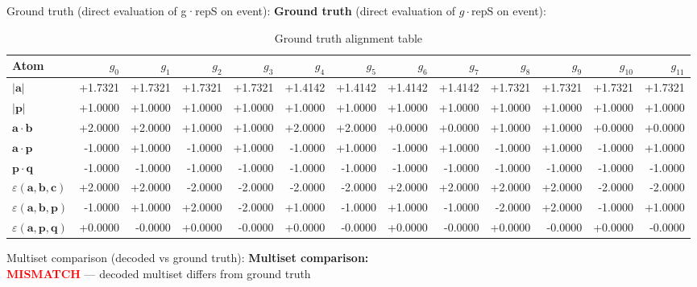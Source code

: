 \documentclass[a4paper,11pt]{article}
\newcommand{\vc}[1]{\ensuremath{\mathbf{#1}}}
\newcommand{\dnfagmiihhiejm}[1]{|\vc{#1}|}
\newcommand{\pdcegfomjfhook}[2]{\mathbf{#1} \cdot \mathbf{#2}}
\newcommand{\kblbmcpggoncpf}[3]{\varepsilon(\mathbf{#1},\mathbf{#2},\mathbf{#3})}
\begin{document}
  Ground truth  (direct evaluation of g·repS on event):
\textbf{Ground truth} (direct evaluation of $g \cdot \text{repS}$ on event):\\
\begin{table}[h]\centering
\caption{Ground truth alignment table}
\begin{tabular}{lrrrrrrrrrrrr}
\toprule
Atom & $g_{0}$ & $g_{1}$ & $g_{2}$ & $g_{3}$ & $g_{4}$ & $g_{5}$ & $g_{6}$ & $g_{7}$ & $g_{8}$ & $g_{9}$ & $g_{10}$ & $g_{11}$ \\
\midrule
$\dnfagmiihhiejm{a}$ & +1.7321 & +1.7321 & +1.7321 & +1.7321 & +1.4142 & +1.4142 & +1.4142 & +1.4142 & +1.7321 & +1.7321 & +1.7321 & +1.7321 \\
$\dnfagmiihhiejm{p}$ & +1.0000 & +1.0000 & +1.0000 & +1.0000 & +1.0000 & +1.0000 & +1.0000 & +1.0000 & +1.0000 & +1.0000 & +1.0000 & +1.0000 \\
$\pdcegfomjfhook{a}{b}$ & +2.0000 & +2.0000 & +1.0000 & +1.0000 & +2.0000 & +2.0000 & +0.0000 & +0.0000 & +1.0000 & +1.0000 & +0.0000 & +0.0000 \\
$\pdcegfomjfhook{a}{p}$ & -1.0000 & +1.0000 & -1.0000 & +1.0000 & -1.0000 & +1.0000 & -1.0000 & +1.0000 & -1.0000 & +1.0000 & -1.0000 & +1.0000 \\
$\pdcegfomjfhook{p}{q}$ & -1.0000 & -1.0000 & -1.0000 & -1.0000 & -1.0000 & -1.0000 & -1.0000 & -1.0000 & -1.0000 & -1.0000 & -1.0000 & -1.0000 \\
$\kblbmcpggoncpf{a}{b}{c}$ & +2.0000 & +2.0000 & -2.0000 & -2.0000 & -2.0000 & -2.0000 & +2.0000 & +2.0000 & +2.0000 & +2.0000 & -2.0000 & -2.0000 \\
$\kblbmcpggoncpf{a}{b}{p}$ & -1.0000 & +1.0000 & +2.0000 & -2.0000 & +1.0000 & -1.0000 & +1.0000 & -1.0000 & -2.0000 & +2.0000 & -1.0000 & +1.0000 \\
$\kblbmcpggoncpf{a}{p}{q}$ & +0.0000 & -0.0000 & +0.0000 & -0.0000 & +0.0000 & -0.0000 & +0.0000 & -0.0000 & +0.0000 & -0.0000 & +0.0000 & -0.0000 \\
\bottomrule\end{tabular}\end{table}

  Multiset comparison  (decoded vs ground truth):
\textbf{Multiset comparison:}\\
\textcolor{red}{\textbf{MISMATCH}} — decoded multiset differs from ground truth
\end{document}
